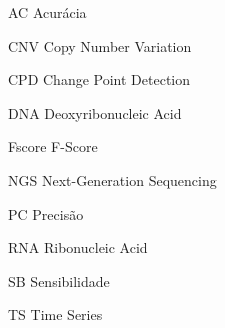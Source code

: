
\begin{siglas}
    \item[AC] Acurácia
    \item[CNV] Copy Number Variation
    \item[CPD] Change Point Detection
    \item[DNA] Deoxyribonucleic Acid
    \item[Fscore] F-Score
    \item[NGS] Next-Generation Sequencing
    \item[PC] Precisão
    \item[RNA] Ribonucleic Acid
    \item[SB] Sensibilidade
    \item[TS] Time Series
\end{siglas}

